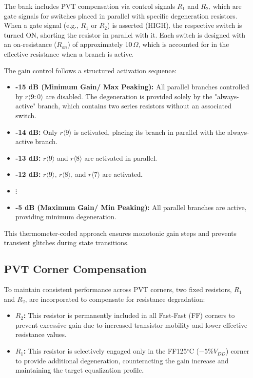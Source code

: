 \noindent The bank includes PVT compensation via control signals $R_1$ and $R_2$, which are gate signals for switches placed in parallel with specific degeneration resistors. When a gate signal (e.g., $R_1$ or $R_2$) is asserted (HIGH), the respective switch is turned ON, shorting the resistor in parallel with it.
\newpage Each switch is designed with an on-resistance ($R_{on}$) of approximately $10\,\Omega$, which is accounted for in the effective resistance when a branch is active.

The gain control follows a structured activation sequence:
\begin{itemize}
    \item \textbf{-15 dB (Minimum Gain/ Max Peaking):} All parallel branches controlled by $r\langle9:0\rangle$ are disabled. The degeneration is provided solely by the "always-active" branch, which contains two series resistors without an associated switch.
    \item \textbf{-14 dB:} Only $r\langle9\rangle$ is activated, placing its branch in parallel with the always-active branch.
    \item \textbf{-13 dB:} $r\langle9\rangle$ and $r\langle8\rangle$ are activated in parallel.
    \item \textbf{-12 dB:} $r\langle9\rangle$, $r\langle8\rangle$, and $r\langle7\rangle$ are activated.
    \item[] \hfil$\vdots$\hfil
    \item \textbf{-5 dB (Maximum Gain/ Min Peaking):} All parallel branches are active, providing minimum degeneration.
\end{itemize}
This thermometer-coded approach ensures monotonic gain steps and prevents transient glitches during state transitions.

\subsection*{PVT Corner Compensation}
To maintain consistent performance across PVT corners, two fixed resistors, $R_1$ and $R_2$, are incorporated to compensate for resistance degradation:
\begin{itemize}
    \item \textbf{$R_2$:} This resistor is permanently included in all Fast-Fast (FF) corners to prevent excessive gain due to increased transistor mobility and lower effective resistance values.
    \item \textbf{$R_1$:} This resistor is selectively engaged only in the FF125$^{\circ}$C ($-5\% V_{DD}$) corner to provide additional degeneration, counteracting the gain increase and maintaining the target equalization profile.
\end{itemize}


